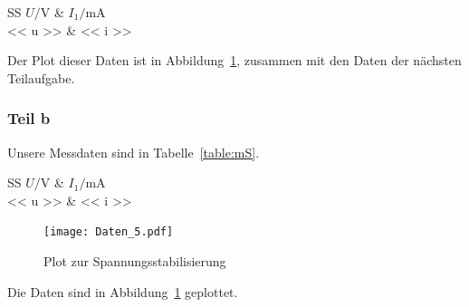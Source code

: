 \begin{table}[htbp]
	\centering
	\caption{%
		Messdaten ohne Stabilisierung
	}
	\label{table:oS}
	\begin{tabular}{SS}
		{$U / \si\volt$} & {$I_1 / \si{\milli\ampere}$} \\
		\hline
		<< u >> & << i >> \\
	\end{tabular}
\end{table}

Der Plot dieser Daten ist in Abbildung~\ref{fig:Stabilisierung}, zusammen mit
den Daten der nächsten Teilaufgabe.

\subsubsection{Teil b}

Unsere Messdaten sind in Tabelle~\ref{table:mS}.

\begin{table}[htbp]
	\centering
	\caption{%
		Messdaten mit Stabilisierung
	}
	\label{table:mS}
	\begin{tabular}{SS}
		{$U / \si\volt$} & {$I_1 / \si{\milli\ampere}$} \\
		\hline
		<< u >> & << i >> \\
	\end{tabular}
\end{table}

\begin{figure}[htbp]
	\centering
	\caption{%
		Plot zur Spannungsstabilisierung
	}
	\label{fig:Stabilisierung}
	\texttt{[image: Daten\_5.pdf]}
\end{figure}

Die Daten sind in Abbildung~\ref{fig:Stabilisierung} geplottet.

\FloatBarrier
\IfFileExists{\bibliographyfile}{
	
}{}



